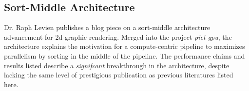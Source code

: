 \subsection{Sort-Middle Architecture\cite{Levien20}}
Dr. Raph Levien publishes a blog piece on a sort-middle architecture advancement for 2d graphic rendering. Merged into the project \textit{piet-gpu}, the architecture explains the motivation for a compute-centric pipeline to maximizes parallelism by sorting in the middle of the pipeline. The performance claims and results listed describe a \emph{signifcant} breakthrough in the architecture, despite lacking the same level of prestigious publication as previous literatures listed here.